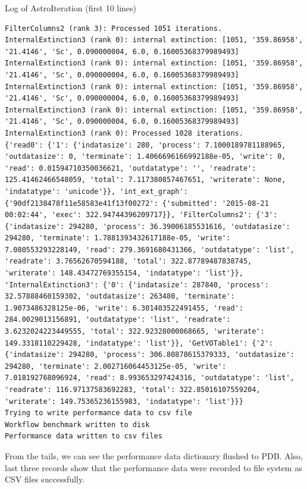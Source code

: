 \documentclass[10pt,twoside,openright,logo]{report}
\begin{document}
\begin{listing}
\caption{Log of AstroIteration (first 10 lines)}
\label{code:astroi-t}
\begin{verbatim}
FilterColumns2 (rank 3): Processed 1051 iterations.
InternalExtinction3 (rank 0): internal extinction: [1051, '359.86958', '21.4146', 'Sc', 0.090000004, 6.0, 0.16005368379989493]
InternalExtinction3 (rank 0): internal extinction: [1051, '359.86958', '21.4146', 'Sc', 0.090000004, 6.0, 0.16005368379989493]
InternalExtinction3 (rank 0): internal extinction: [1051, '359.86958', '21.4146', 'Sc', 0.090000004, 6.0, 0.16005368379989493]
InternalExtinction3 (rank 0): internal extinction: [1051, '359.86958', '21.4146', 'Sc', 0.090000004, 6.0, 0.16005368379989493]
InternalExtinction3 (rank 0): Processed 1028 iterations.
{'read0': {'1': {'indatasize': 280, 'process': 7.1000189781188965, 'outdatasize': 0, 'terminate': 1.4066696166992188e-05, 'write': 0, 'read': 0.01594710350036621, 'outdatatype': '', 'readrate': 125.41462466548059, 'total': 7.117380857467651, 'writerate': None, 'indatatype': 'unicode'}}, 'int_ext_graph': {'90df2138478f11e58583e41f13f00272': {'submitted': '2015-08-21 00:02:44', 'exec': 322.94744396209717}}, 'FilterColumns2': {'3': {'indatasize': 294280, 'process': 36.39006185531616, 'outdatasize': 294280, 'terminate': 1.7881393432617188e-05, 'write': 7.080553293228149, 'read': 279.3691680431366, 'outdatatype': 'list', 'readrate': 3.76562670594188, 'total': 322.87789487838745, 'writerate': 148.43472769355154, 'indatatype': 'list'}}, 'InternalExtinction3': {'0': {'indatasize': 287840, 'process': 32.57888460159302, 'outdatasize': 263480, 'terminate': 1.9073486328125e-06, 'write': 6.301403522491455, 'read': 284.0029013156891, 'outdatatype': 'list', 'readrate': 3.6232024223449555, 'total': 322.92328000068665, 'writerate': 149.3318110229428, 'indatatype': 'list'}}, 'GetVOTable1': {'2': {'indatasize': 294280, 'process': 306.80878615379333, 'outdatasize': 294280, 'terminate': 2.002716064453125e-05, 'write': 7.018192768096924, 'read': 8.993653297424316, 'outdatatype': 'list', 'readrate': 116.97137583692283, 'total': 322.85016107559204, 'writerate': 149.75365236155983, 'indatatype': 'list'}}}
Trying to write performance data to csv file
Workflow benchmark written to disk
Performance data written to csv files
\end{verbatim}
\end{listing}

From the tails, we can see the performance data dictionary flushed to PDB. Also, last three records show that the performance data were recorded to file system as CSV files successfully.
\end{document}
